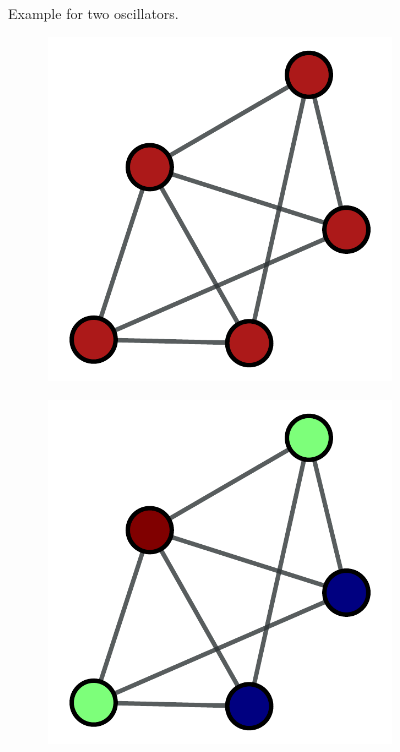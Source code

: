 \documentclass{beamer}
\begin{document}
\begin{frame}
\begin{figure}[t]
\begin{subfigure}[b]{0.3\textwidth}
\begin{tikzpicture}
		\end{tikzpicture}
	\end{subfigure}\\
	\caption{Example for two oscillators.}\label{fig:Phase_Shift}
\end{figure}
\begin{figure}[b]
	\centering
	\begin{subfigure}[b]{0.35\textwidth}
		\includegraphics[scale=0.25]{Figure/basicGraph.pdf}
	\end{subfigure}%
	\begin{subfigure}[b]{0.35\textwidth}
		\includegraphics[scale=0.25]{Figure/basicGraphColoried.pdf}

\end{subfigure}
\end{figure}
\end{frame}
\end{document}
